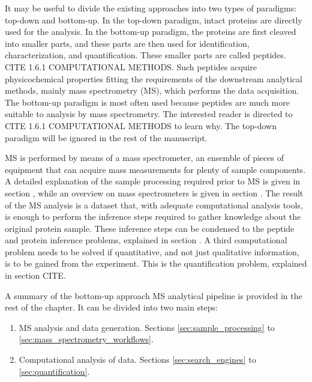 \documentclass[11pt, a4paper]{report}
\begin{document}
It may be useful to divide the existing approaches into two types of paradigms: top-down and bottom-up. In the top-down paradigm, intact proteins are directly used for the analysis. In the bottom-up paradigm, the proteins are first cleaved into smaller parts, and these parts are then used for identification, characterization, and quantification. These smaller parts are called peptides. CITE 1.6.1 COMPUTATIONAL METHODS. Such peptides acquire physicochemical properties fitting the requirements of the downstream analytical methods, mainly mass spectrometry (MS), which performs the data acquisition. The bottom-up paradigm is most often used because peptides are much more suitable to analysis by mass spectrometry. The interested reader is directed to CITE 1.6.1 COMPUTATIONAL METHODS to learn why. The top-down paradigm will be ignored in the rest of the manuscript.

MS is performed by means of a mass spectrometer, an ensemble of pieces of equipment that can acquire mass measurements for plenty of sample components. A detailed explanation of the sample processing required prior to MS is given in section \label{sec:sample processing}, while an overview on mass spectrometers is given in section \label{sec:the mass spectrometer}. The result of the MS analysis is a dataset that, with adequate computational analysis tools, is enough to perform the inference steps required to gather knowledge about the original protein sample. These inference steps can be condensed to the peptide and protein inference problems, explained in section \label{sec:peptide and protein inference}. A third computational problem needs to be solved if quantitative, and not just qualitative information, is to be gained from the experiment. This is the quantification problem, explained in section \label{sec:quantification} CITE.

A summary of the bottom-up approach MS analytical pipeline is provided in the rest of the chapter. It can be divided into two main steps:

\begin{enumerate}

\item \ac{MS} analysis and data generation. Sections \ref{sec:sample_processing} to \ref{sec:mass_spectrometry_workflows}.

\item Computational analysis of data. Sections \ref{sec:search_engines} to \ref{sec:quantification}.

\end{enumerate}
\end{document}
